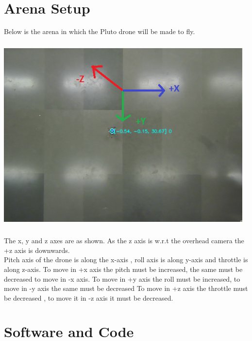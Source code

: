 \documentclass[a4paper,12pt,oneside]{book}
\begin{document}
\section{ Arena Setup}
Below is the arena in which the Pluto drone will be made to fly.\\
\vspace{1em}
\begin{center}
    \includegraphics[width = 13cm , height= 10cm]{deck1.png}
\end{center}

\vspace{1em}

The x, y and z axes are as shown. As the z axis is w.r.t the overhead camera the +z axis is downwards.\\
Pitch axis of the drone is along the x-axis , roll axis is along y-axis and throttle is along z-axis.
To move in +x axis the pitch must be increased, the same must be decreased to move in -x axis.
To move in +y axis the roll must be increased, to move in -y axis  the same must be decreased
To move in +z axis the throttle must be decreased , to move it in -z axis it must be decreased.



\section{Software and Code}
\end{document}

